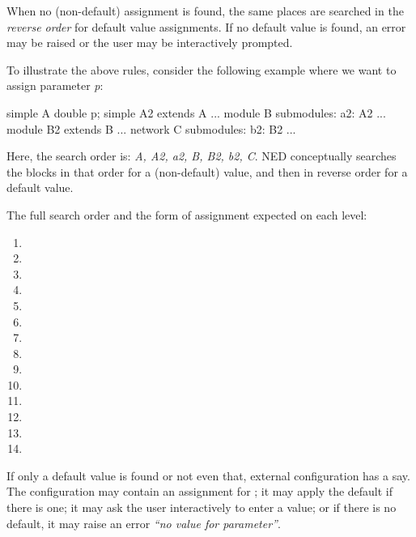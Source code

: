 {When no (non-default) assignment is found, the same places are searched in the
\textit{reverse order} for default value assignments. If no default value is
found, an error may be raised or the user may be interactively prompted.

To illustrate the above rules, consider the following example where we
want to assign parameter \textit{p}:

\begin{ned}
simple A { double p; }
simple A2 extends A {...}
module B { submodules: a2: A2 {...} }
module B2 extends B {...}
network C { submodules: b2: B2 {...} }
\end{ned}

Here, the search order is: \textit{A, A2, a2, B, B2, b2, C}. NED
conceptually searches the  blocks in that order for a
(non-default) value, and then in reverse order for a default value.

The full search order and the form of assignment expected on each level:

\begin{enumerate}
  \item {}
  \item {}
  \item {}
  \item {}
  \item {}
  \item {}
  \item {}
  \item {}
  \item {}
  \item {}
  \item {}
  \item {}
  \item {}
  \item {}
\end{enumerate}

If only a default value is found or not even that, external configuration
has a say. The configuration may contain an assignment for ;
it may apply the default if there is one; it may ask the user interactively
to enter a value; or if there is no default, it may raise an error
\textit{``no value for parameter''}.



}

